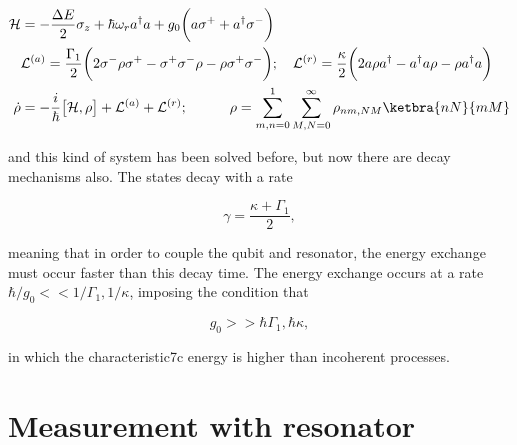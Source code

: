       \noindent  {}

      \begin{equation}\label{ar1}
        \begin{aligned}
          \mathcal{H} & ={-\frac{\Delta E}{2}\sigma_z}+{{\hbar\omega_r}a^\dagger a} + {g_0\bigg({a\sigma^+}+{a^{\dagger}\sigma^-}\bigg)}\\
          &\mathcal{L}^{(a)} = \frac{\Gamma_1}{2}\bigg(2\sigma^{-}\rho \sigma^{+}-\sigma^{+}\sigma^{-}\rho-\rho \sigma^{+}\sigma^{-}\bigg);\quad\mathcal{L}^{(r)} = \frac{\kappa}{2}\bigg(2a\rho a^{\dagger}-a^{\dagger}a\rho-\rho a^{\dagger}a\bigg)\\
          \dot{\rho} & = -\frac{i}{\hbar}\big[\mathcal{H},\rho\big]+\mathcal{L}^{(a)}+\mathcal{L}^{(r)};\quad\quad\quad \rho = \sum_{m,n=0}^{1}\sum_{M,N=0}^{\infty}\rho_{nm,NM}\ketbra{nN}{mM}\\
        \end{aligned}
      \end{equation}

      \noindent  and this  kind of  system has  been solved
      before, but now there are decay mechanisms also.  The
      states decay with a rate

\begin{equation}\label{ardecay}
  \gamma=\frac{\kappa+\Gamma_1}{2},
\end{equation}

\noindent meaning  that in  order to  couple the  qubit and
resonator, the energy exchange  must occur faster than this
decay  time.    The  energy  exchange  occurs   at  a  rate
$ \hbar/g_0 << 1/\Gamma_1,1/\kappa$, imposing the condition that

\begin{equation}\label{arD}
  g_0>>\hbar\Gamma_1,\hbar\kappa,
\end{equation}

\noindent in  which the  characteristic7c energy  is higher
than incoherent processes.

\begin{figure}[h]
\end{figure}


\newpage
\section{Measurement with resonator}
\label{sec:meas-with-reson}

